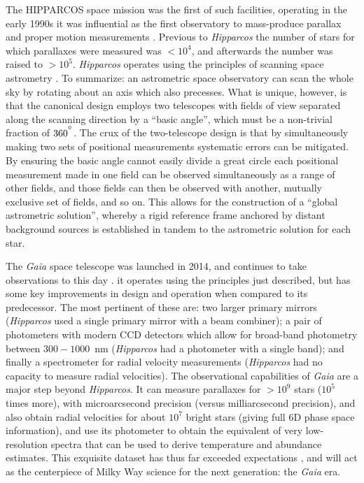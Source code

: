 The HIPPARCOS space mission was the first of such facilities, operating in the early 1990s it was influential as the first observatory to mass-produce parallax and proper motion measurements \parencite{hipparcos}. Previous to \textit{Hipparcos} the number of stars for which parallaxes were measured was $< 10^{4}$, and afterwards the number was raised to $> 10^{5}$. \textit{Hipparcos} operates using the principles of scanning space astrometry \parencite[see][]{lindegren10}. To summarize: an astrometric space observatory can scan the whole sky by rotating about an axis which also precesses. What is unique, however, is that the canonical design employs two telescopes with fields of view separated along the scanning direction by a ``basic angle'', which must be a non-trivial fraction of $360^{\hbox{$^\circ$}}$. The crux of the two-telescope design is that by simultaneously making two sets of positional measurements systematic errors can be mitigated. By ensuring the basic angle cannot easily divide a great circle each positional measurement made in one field can be observed simultaneously as a range of other fields, and those fields can then be observed with another, mutually exclusive set of fields, and so on. This allows for the construction of a ``global astrometric solution'', whereby a rigid reference frame anchored by distant background sources is established in tandem to the astrometric solution for each star.

The \textit{Gaia} space telescope was launched in 2014, and continues to take observations to this day \parencite[see][ for design specifications and related references]{gaia}. it operates using the principles just described, but has some key improvements in design and operation when compared to its predecessor. The most pertinent of these are: two larger primary mirrors (\textit{Hipparcos} used a single primary mirror with a beam combiner); a pair of photometers with modern CCD detectors which allow for broad-band photometry between $300-1000$~nm (\textit{Hipparcos} had a photometer with a single band); and finally a spectrometer for radial velocity measurements (\textit{Hipparcos} had no capacity to measure radial velocities). The observational capabilities of \textit{Gaia} are a major step beyond \textit{Hipparcos}. It can measure parallaxes for $> 10^{9}$ stars ($10^{5}$ times more), with microarcsecond precision (versus milliarcsecond precision), and also obtain radial velocities for about $10^{7}$ bright stars (giving full 6D phase space information), and use its photometer to obtain the equivalent of very low-resolution spectra that can be used to derive temperature and abundance estimates. This exquisite dataset has thus far exceeded expectations \parencite[e.g. see a commentary and review by][shortly after the second data release]{brown21}, and will act as the centerpiece of Milky Way science for the next generation: the \textit{Gaia} era.

